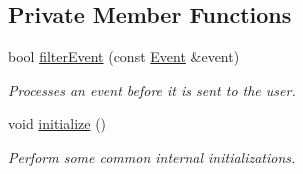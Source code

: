 \subsection*{Private Member Functions}
\begin{DoxyCompactItemize}
\item 
bool \mbox{\hyperlink{classsf_1_1_window_afd3f9e9c21dcd1fd25a38a87026a159b}{filter\+Event}} (const \mbox{\hyperlink{classsf_1_1_event}{Event}} \&event)
\begin{DoxyCompactList}\small\item\em Processes an event before it is sent to the user. \end{DoxyCompactList}\item 
void \mbox{\hyperlink{classsf_1_1_window_a75a8263a54f73f71572ce69f0f0cbbca}{initialize}} ()
\begin{DoxyCompactList}\small\item\em Perform some common internal initializations. \end{DoxyCompactList}\end{DoxyCompactItemize}
